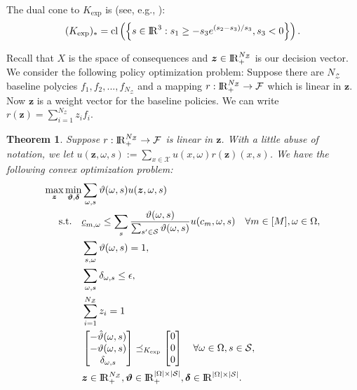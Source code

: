 \documentclass[11pt,oneside]{article}
\theoremstyle{plain}
\theoremstyle{plain}
\theoremstyle{plain}
\newtheorem{thm}{Theorem}[section]
\theoremstyle{plain}
\theoremstyle{plain}
\theoremstyle{definition}
\theoremstyle{definition}
\theoremstyle{remark}
\theoremstyle{plain}
\newcommand{\R}{{\rm I\!R}}
\newcommand{\F}{{\cal F}}
\renewcommand{\Re}{\R}
\renewcommand{\Re}{\R}
\newcommand{\mcs}{{\cal S}}
\begin{document}
The dual cone to $K_\text{exp}$ is (see, e.g., \cite{serrano2015algorithms}):
$$
(K_{\text{exp}})_* = \text{cl}\left( \left\{  s\in \Re^3: s_1 \geq -s_3 e^{(s_2-s_3)/s_3},s_3 <0\right\} \right).
$$

Recall that $X$ is the space of consequences and $\boldsymbol{z} \in \R^{N_\mathcal{Z}}_+$ is our decision vector. We consider the following policy optimization problem:
Suppose there are $N_\mathcal{Z}$ baseline polycies $f_1,f_2,...,f_{N_\mathcal{Z}}$ and a mapping $r: \R^{N_\mathcal{Z}}_+ \to \F$ which is linear in $\boldsymbol{z}$. Now $\boldsymbol{z}$ is a weight
vector for the baseline policies. We can write $r(\boldsymbol{z}) = \sum_{i=1}^{N_\mathcal{Z}} z_i f_i$.

\begin{thm}
\label{thm:convex_formulation}
Suppose $r:\R^{N_\mathcal{Z}}_+ \to \F$ is linear in $\boldsymbol{z}$. With a little abuse of notation, we let $u(\boldsymbol{z},\omega,s):= \sum_{x\in \mathcal{X}}u(x,\omega)r(\boldsymbol{z})(x,s)$.
We have the following convex optimization problem:
    \begin{align*}
        \max_{\boldsymbol{z}} \min_{\boldsymbol{\vartheta},\boldsymbol{\delta}} & \sum_{\omega,s}\vartheta(\omega,s) u(\boldsymbol{z},\omega,s) \\
        \text{s.t.}  \quad & \underline{c}_{m,\omega} \leq \sum_{s} \frac{\vartheta(\omega,s)}{\sum_{s'\in \mcs}\vartheta(\omega,s)} u(c_m,\omega,s) \quad \forall m \in [M], \omega \in \Omega, \\
        & \sum_{s,\omega} \vartheta(\omega,s) = 1, \\
        & \sum_{\omega,s} \delta_{\omega,s} \leq \epsilon, \\
        & \sum_{i=1} ^{N_\mathcal{Z}} z_i =1 \\
        & \begin{bmatrix}
            -\hat{\vartheta}(\omega,s) \\
            -\vartheta(\omega,s) \\
            \delta_{\omega,s}
        \end{bmatrix} \preceq_{K_{\text{exp}}} \begin{bmatrix}
            0 \\
            0 \\
            0
        \end{bmatrix} \quad \forall \omega \in \Omega, s\in \mcs,\\
        & \boldsymbol{z} \in \R^{N_\mathcal{Z}}_+, \boldsymbol{\vartheta} \in \R_+^{|\Omega|\times |\mcs|}, \boldsymbol{\delta}\in \Re^{|\Omega|\times |\mcs|}.
    \end{align*}


\end{thm}
\end{document}
